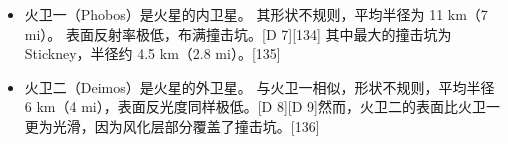 \begin{itemize}
极地地区覆盖着由水和二氧化碳组成的白色冰盖。[127]  
火星大气主要由二氧化碳组成，表面气压仅为地球的 0.6%
但仍足以产生一些天气现象。[128]  
火星年为 687 个地球日，其表面温度变化剧烈，  
范围从 −78.5 °C（−109.3 °F）至 5.7 °C（42.3 °F）。  
表面布满火山与裂谷，并富含多种矿物。[129][130]  
火星内部结构高度分化，并在约 40 亿年前失去了磁层。[131][132]  
火星拥有两颗微小卫星：[133]
\item 火卫一（Phobos）是火星的内卫星。  
其形状不规则，平均半径为 11 km（7 mi）。  
表面反射率极低，布满撞击坑。[D 7][134]  
其中最大的撞击坑为 Stickney，半径约 4.5 km（2.8 mi）。[135]
\item 火卫二（Deimos）是火星的外卫星。  
与火卫一相似，形状不规则，平均半径 6 km（4 mi），表面反光度同样极低。[D 8][D 9]然而，火卫二的表面比火卫一更为光滑，因为风化层部分覆盖了撞击坑。[136]
\end{itemize}




